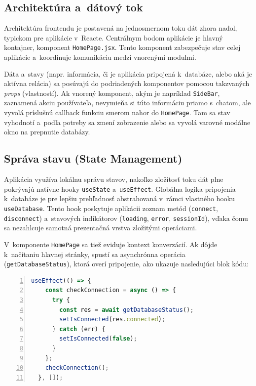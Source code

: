 \documentclass[a4paper, 12pt]{article}
\begin{document}
\subsection{Architektúra a~dátový tok}

Architektúra frontendu je postavená na jednosmernom toku dát zhora nadol, typickom pre aplikácie v~Reacte. Centrálnym bodom aplikácie je hlavný kontajner, komponent \texttt{HomePage.jsx}. Tento komponent zabezpečuje stav celej aplikácie a~koordinuje komunikáciu medzi vnorenými modulmi.

Dáta a~stavy (napr. informácia, či je aplikácia pripojená k~databáze, alebo aká je aktívna relácia) sa posúvajú do podriadených komponentov pomocou takzvaných \textit{props} (vlastností). Ak vnorený komponent, akým je napríklad \texttt{SideBar}, zaznamená akciu používateľa, nevymieňa si túto informáciu priamo s~chatom, ale vyvolá príslušnú callback funkciu smerom nahor do \texttt{HomePage}. Tam sa stav vyhodnotí a~podľa potreby sa zmení zobrazenie alebo sa vyvolá varovné modálne okno na prepnutie databázy.
\clearpage
\subsection{Správa stavu (State Management)}

Aplikácia využíva lokálnu správu stavov, nakoľko zložitosť toku dát plne pokrývajú natívne hooky \texttt{useState} a~\texttt{useEffect}. Globálna logika pripojenia k~databáze je pre lepšiu prehľadnosť abstrahovaná v~rámci vlastného hooku \texttt{useDatabase}. Tento hook poskytuje aplikácii zoznam metód (\texttt{connect}, \texttt{disconnect}) a~stavových indikátorov (\texttt{loading}, \texttt{error}, \texttt{sessionId}), vďaka čomu sa nezahlcuje samotná prezentačná vrstva zložitými operáciami.

V~komponente \texttt{HomePage} sa tiež eviduje kontext konverzácií. Ak dôjde k~načítaniu hlavnej stránky, spustí sa asynchrónna operácia (\texttt{getDatabaseStatus}), ktorá overí pripojenie, ako ukazuje nasledujúci blok kódu:

\begin{lstlisting}[language=JavaScript, frame=single, numbers=left, breaklines=true]
  useEffect(() => {
    const checkConnection = async () => {
      try {
        const res = await getDatabaseStatus();
        setIsConnected(res.connected);
      } catch (err) {
        setIsConnected(false);
      }
    };
    checkConnection();
  }, []);
\end{lstlisting}
\end{document}
